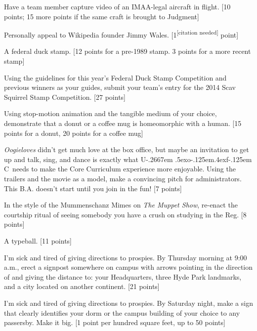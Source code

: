 \documentclass{book}
\def\UofC{U\kern-.2667em \lower.5ex\hbox{o}\kern-.125em\raise.4ex\hbox{f}\kern-.125em C}
\begin{document}
\begin{list}{}{}
\item Have a team member capture video of an IMAA-legal aircraft in flight. [10 points; 15 more points if the same craft is brought to Judgment]

\item Personally appeal to Wikipedia founder Jimmy Wales. [1\textsuperscript{[citation needed]} point]

\item A federal duck stamp. [12 points for a pre-1989 stamp. 3 points for a more recent stamp]

\item Using the guidelines for this year's Federal Duck Stamp Competition and previous winners as your guides, submit your team's entry for the 2014 Scav Squirrel Stamp Competition. [27 points]

\item Using stop-motion animation and the tangible medium of your choice, demonstrate that a donut or a coffee mug is homeomorphic with a human. [15 points for a donut, 20 points for a coffee mug]

\item \emph{Oogieloves} didn't get much love at the box office, but maybe an invitation to get up and talk, sing, and dance is exactly what \UofC\ needs to make the Core Curriculum experience more enjoyable. Using the trailers and the movie as a model, make a convincing pitch for administrators. This B.A. doesn't start until you join in the fun! [7 points]

\item  In the style of the Mummenschanz Mimes on \emph{The Muppet Show}, re-enact the courtship ritual of seeing somebody you have a crush on studying in the Reg. [8 points]

\item A typeball. [11 points]

\item I'm sick and tired of giving directions to prospies. By Thursday morning at 9:00 a.m., erect a signpost somewhere on campus with arrows pointing in the direction of and giving the distance to: your Headquarters, three Hyde Park landmarks, and a city located on another continent. [21 points]

\item I'm sick and tired of giving directions to prospies. By Saturday night, make a sign that clearly identifies your dorm or the campus building of your choice to any passersby. Make it big. [1 point per hundred square feet, up to 50 points] 


\end{list}
\end{document}
